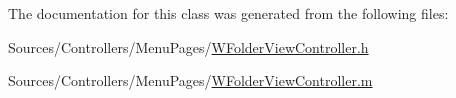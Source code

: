 The documentation for this class was generated from the following files\-:\begin{DoxyCompactItemize}
\item 
Sources/\-Controllers/\-Menu\-Pages/\hyperlink{_w_folder_view_controller_8h}{W\-Folder\-View\-Controller.\-h}\item 
Sources/\-Controllers/\-Menu\-Pages/\hyperlink{_w_folder_view_controller_8m}{W\-Folder\-View\-Controller.\-m}\end{DoxyCompactItemize}
